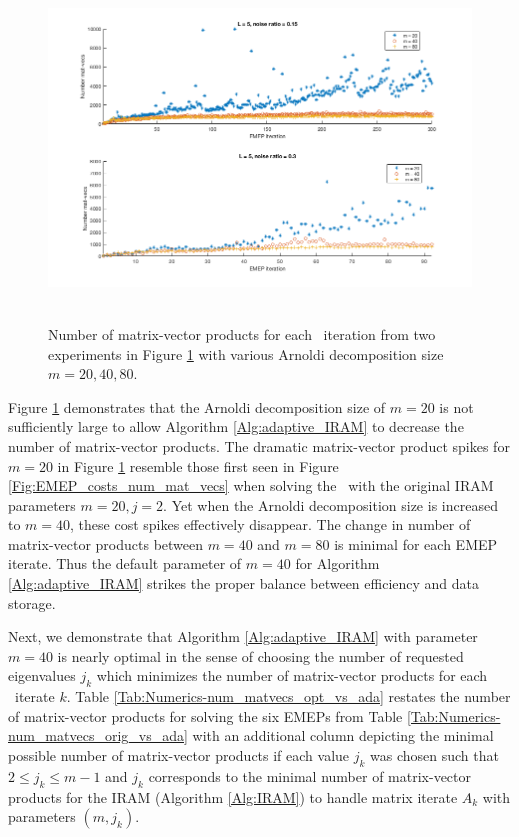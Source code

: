 \begin{figure}[H]
\centering
\hbox{\hspace{-1.6cm} \includegraphics[scale=0.6]{Numerics-num_matvecs_ada_for_m_vals} }\vspace{0.0cm}
	\caption{Number of matrix-vector products for each \emep \ iteration from two experiments in Figure \ref{Fig:Numerics-num_matvecs_ada_for_m_vals} with various Arnoldi decomposition size $m=20, 40, 80$.}
\label{Fig:Numerics-num_matvecs_ada_for_m_vals}
\end{figure}




Figure \ref{Fig:Numerics-num_matvecs_ada_for_m_vals} demonstrates that the Arnoldi decomposition size of $m=20$ is not sufficiently large to allow Algorithm \ref{Alg:adaptive_IRAM} to decrease the number of matrix-vector products.  
The dramatic matrix-vector product spikes for $m=20$ in Figure \ref{Fig:Numerics-num_matvecs_ada_for_m_vals} resemble those first seen in Figure \ref{Fig:EMEP_costs_num_mat_vecs} when solving the \emep \ with the original IRAM parameters $m=20, j=2$.
Yet when the Arnoldi decomposition size is increased to $m=40$, these cost spikes effectively disappear.
The change in number of matrix-vector products between $m=40$ and $m=80$ is minimal for each EMEP iterate.  
Thus the default parameter of $m=40$ for Algorithm \ref{Alg:adaptive_IRAM} strikes the proper balance between efficiency and data storage.






Next, we demonstrate that Algorithm \ref{Alg:adaptive_IRAM} with parameter $m=40$ is nearly optimal in the sense of choosing the number of requested eigenvalues $j_k$ which minimizes the number of matrix-vector products for each \emep \ iterate $k$.
Table \ref{Tab:Numerics-num_matvecs_opt_vs_ada} restates the number of matrix-vector products for solving the six EMEPs from Table \ref{Tab:Numerics-num_matvecs_orig_vs_ada} with an additional column depicting the minimal possible number of matrix-vector products if each value $j_k$ was chosen such that $2 \leq j_k\leq m-1$ and $j_k$ corresponds to the minimal number of matrix-vector products for the IRAM (Algorithm \ref{Alg:IRAM}) to handle matrix iterate $A_k$ with parameters $(m, j_k)$.


